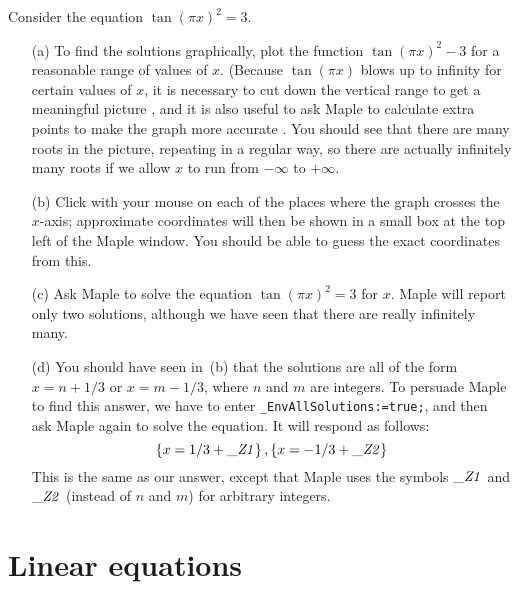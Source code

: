 \documentclass[a4paper,10pt]{amsbook}
\numberwithin{example}{chapter}
\begin{document}
\begin{exercise}
 Consider the equation $\tan(\pi x)^2=3$.  
 \begin{itemize}
  \item[(a)] To find the solutions graphically, plot the
   function $\tan(\pi x)^2-3$ for a reasonable range of
   values of $x$.  (Because $\tan(\pi x)$ blows up to
   infinity for certain values of $x$, it is necessary to cut
   down the vertical range to get a meaningful picture
   \note{\NOTEvertrange}, and it is also useful to ask Maple
   to calculate extra points to make the graph more accurate
   \note{\NOTEnumpoints}.  You should see that there are many
   roots in the picture, repeating in a regular way, so there
   are actually infinitely many roots if we allow $x$ to run
   from $-\infty$ to $+\infty$.
  \item[(b)] Click with your mouse on each of the places where the
   graph crosses the $x$-axis; approximate coordinates will then be
   shown in a small box at the top left of the Maple window.  You
   should be able to guess the exact coordinates from this. 
  \item[(c)] Ask Maple to solve the equation $\tan(\pi x)^2=3$ for $x$. 
   Maple will report only two solutions, although we have seen that
   there are really infinitely many. 
  \item[(d)] You should have seen in~(b) that the solutions are all of
   the form $x=n+1/3$ or $x=m-1/3$, where $n$ and $m$ are integers. 
   To persuade Maple to find this answer, we have to enter
   \verb~_EnvAllSolutions:=true;~, and then ask Maple again to solve
   the equation.  It will respond as follows:
   \[ \left\{ x=1/3+{\it \_Z1} \right\} ,
      \left\{ x=-1/3+{\it \_Z2} \right\} 
   \]
   This is the same as our answer, except that Maple uses the symbols 
   $\it \_Z1$ and $\it \_Z2$ (instead of $n$ and $m$) for arbitrary
   integers.  
 \end{itemize}
\end{exercise}

\section{Linear equations}
 
\end{document}

